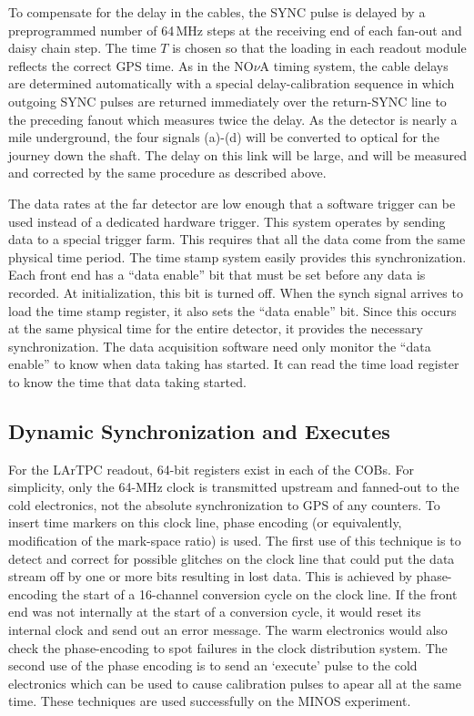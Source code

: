 To compensate for the delay in the cables, the SYNC pulse is delayed
by a preprogrammed number of 64\,MHz steps at the receiving end of
each fan-out and daisy chain step.  The time $T$ %
is
chosen so that the loading in each readout module reflects the correct
GPS time.  As in the NO$\nu$A timing system, the cable delays are
determined automatically with a special delay-calibration sequence in
which outgoing SYNC pulses are returned immediately over the
return-SYNC line to the preceding fanout which measures twice the
delay.  As the detector is nearly a mile underground, the four signals
(a)-(d) will be converted to optical for the journey down the shaft.
The delay on this link will be large, and will be measured and
corrected by the same procedure as described above.

The data rates at the far detector are low enough that a software
trigger can be used instead of a dedicated hardware trigger.  This
system operates by sending data to a special trigger farm.  This
requires that all the data come from the same physical time period.
The time stamp system easily provides this synchronization.  Each
front end has a ``data enable'' bit that must be set before any data is
recorded.  At initialization, this bit is turned off.  When the synch
signal arrives to load the time stamp register, it also sets the ``data
enable'' bit.  Since this occurs at the same physical time for the
entire detector, it provides the necessary synchronization.  The data
acquisition software need only monitor the ``data enable'' to know when
data taking has started.  It can read the time load register to know
the time that data taking started.

\subsection{Dynamic Synchronization and Executes}
\label{sec:dyn-sync-exec}
For the LArTPC readout, 64-bit registers exist in each of the COBs.
For simplicity, only the 64-MHz clock is transmitted upstream and
fanned-out to the cold electronics, not the absolute synchronization
to GPS of any counters.  To insert time markers on this clock line,
phase encoding (or equivalently, modification of the mark-space ratio)
is used.  The first use of this technique is to detect and correct for
possible glitches on the clock line that could put the data stream off
by one or more bits resulting in lost data.  This is achieved by phase-encoding the start of a 16-channel conversion cycle on the clock line.
If the front end was not internally at the start of a conversion
cycle, it would reset its internal clock and send out an error
message.  The warm electronics would also check the phase-encoding to
spot failures in the clock distribution system.  The second use of the
phase encoding is to send an `execute' pulse to the cold electronics
which can be used to cause calibration pulses to apear all at the same
time.  These techniques are used successfully on the MINOS experiment.

